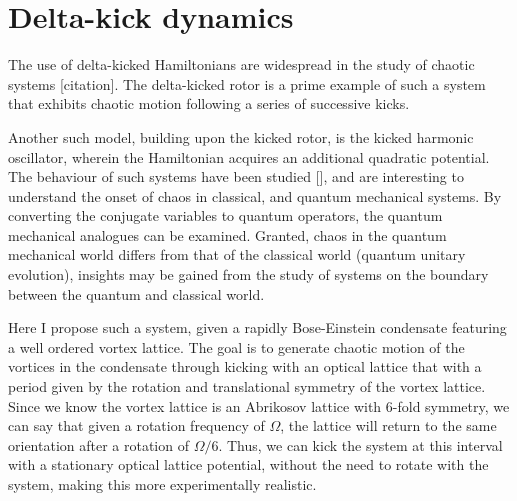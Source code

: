 \section{Delta-kick dynamics}
The use of delta-kicked Hamiltonians are widespread in the study of chaotic systems [citation]. The delta-kicked rotor is a prime example of such a system that exhibits chaotic motion following a series of successive kicks.

Another such model, building upon the kicked rotor, is the kicked harmonic oscillator, wherein the Hamiltonian acquires an additional quadratic potential. The behaviour of such systems have been studied [], and are interesting to understand the onset of chaos in classical, and quantum mechanical systems. By converting the conjugate variables to quantum operators, the quantum mechanical analogues can be examined. Granted, chaos in the quantum mechanical world differs from that of the classical world (quantum unitary evolution), insights may be gained from the study of systems on the boundary between the quantum and classical world.

Here I propose such a system, given a rapidly Bose-Einstein condensate featuring a well ordered vortex lattice. The goal is to generate chaotic motion of the vortices in the condensate through kicking with an optical lattice that with a period given by the rotation and translational symmetry of the vortex lattice. Since we know the vortex lattice is an Abrikosov lattice with 6-fold symmetry, we can say that given a rotation frequency of $\Omega$, the lattice will return to the same orientation after a rotation of $\Omega/6$. Thus, we can kick the system at this interval with a stationary optical lattice potential, without the need to rotate with the system, making this more experimentally realistic.


